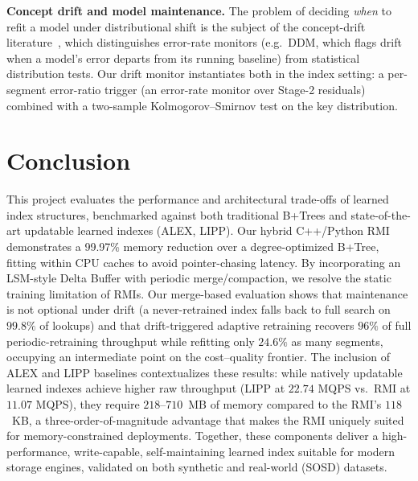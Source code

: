 \documentclass[sigconf, nonacm]{acmart}
\begin{document}
\noindent\textbf{Concept drift and model maintenance.} The problem of deciding \emph{when} to refit a model under distributional shift is the subject of the concept-drift literature~\cite{gama2014survey}, which distinguishes error-rate monitors (e.g.\ DDM, which flags drift when a model's error departs from its running baseline) from statistical distribution tests. Our drift monitor instantiates both in the index setting: a per-segment error-ratio trigger (an error-rate monitor over Stage-2 residuals) combined with a two-sample Kolmogorov--Smirnov test on the key distribution. 

\section{Conclusion}
This project evaluates the performance and architectural trade-offs of learned index structures, benchmarked against both traditional B+Trees and state-of-the-art updatable learned indexes (ALEX, LIPP). Our hybrid C++/Python RMI demonstrates a 99.97\% memory reduction over a degree-optimized B+Tree, fitting within CPU caches to avoid pointer-chasing latency. By incorporating an LSM-style Delta Buffer with periodic merge/compaction, we resolve the static training limitation of RMIs. Our merge-based evaluation shows that maintenance is not optional under drift (a never-retrained index falls back to full search on $99.8\%$ of lookups) and that drift-triggered adaptive retraining recovers $96\%$ of full periodic-retraining throughput while refitting only $24.6\%$ as many segments, occupying an intermediate point on the cost--quality frontier. The inclusion of ALEX and LIPP baselines contextualizes these results: while natively updatable learned indexes achieve higher raw throughput (LIPP at $22.74$ MQPS vs.\ RMI at $11.07$ MQPS), they require $218$--$710$~MB of memory compared to the RMI's $118$~KB, a three-order-of-magnitude advantage that makes the RMI uniquely suited for memory-constrained deployments. Together, these components deliver a high-performance, write-capable, self-maintaining learned index suitable for modern storage engines, validated on both synthetic and real-world (SOSD) datasets.



\end{document}
